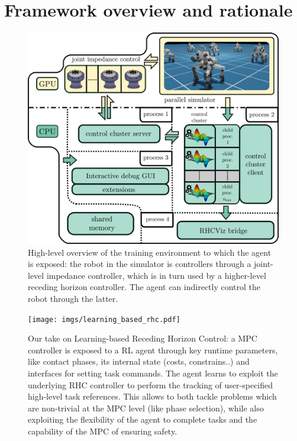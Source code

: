 \section{Framework overview and rationale}

\begin{figure}[t]
	\centering
	\includegraphics[width=1.0\columnwidth]{imgs/cocluster_arch.pdf}
	\caption{High-level overview of the training environment to which the agent is exposed: the robot in the simulator is controllers through a joint-level impedance controller, which is in turn used by a higher-level receding horizon controller. The agent can indirectly control the robot through the latter.}
	\label{fig:coclbridge_arch}
\end{figure}
\cite{mystuff::lrhccontrol}
\cite{mystuff::omnirobogym}
\cite{mystuff::coclusterbridge}
\cite{mystuff::rhcviz}
\cite{mystuff::sharsoripcpp}

\begin{figure}[t]
	\centering
	\vspace{0.1cm}
	\texttt{[image: imgs/learning\_based\_rhc.pdf]}
	\caption{Our take on Learning-based Receding Horizon Control: a MPC controller is exposed to a RL agent through key runtime parameters, like contact phases, its internal state (costs, constrains..) and interfaces for setting task commands. The agent learns to exploit the underlying RHC controller to perform the tracking of user-specified high-level task references. This allows to both tackle problems which are non-trivial at the MPC level (like phase selection), while also exploiting the flexibility of the agent to complete tasks and the capability of the MPC of ensuring safety.}
	\label{fig:lrhc_arch}
\end{figure}